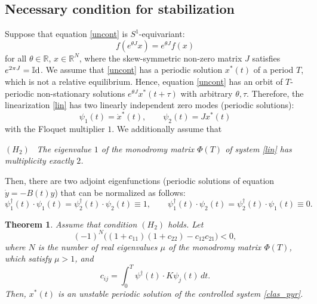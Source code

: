 \documentclass{article}
\newtheorem{theorem}{Theorem}[section]
\begin{document}
\subsection{Necessary condition for stabilization}
Suppose that equation \eqref{uncont} is $S^1$-equivariant:
\begin{equation}\label{21}
f(e^{\theta J}x)=e^{\theta J} f(x)
\end{equation}
for all $\theta \in\mathbb{R}$, $x\in\mathbb{R}^N$, where the skew-symmetric non-zero matrix $J$ satisfies $e^{2\pi J}=\mathbb{I}{\rm d}$.
We assume that \eqref{uncont} has a periodic solution $x^*(t)$ of a period $T$, which is not a relative equilibrium. Hence, equation \eqref{uncont} has
an orbit of $T$-periodic non-stationary solutions $e^{\theta J} x^*(t+\tau)$ with arbitrary $\theta,\tau$.
Therefore, the linearization \eqref{lin} has two linearly independent zero modes (periodic solutions):
\begin{equation}\label{22}
\psi_1(t)=\dot x^*(t),\qquad \psi_2(t)=J x^*(t)
\end{equation}
with the Floquet multiplier $1$.
We additionally assume that 

\bigskip
$(H_2)$ \ {\em The eigenvalue $1$ of the monodromy matrix $\Phi(T)$ of system \eqref{lin} has multiplicity exactly $2$.}

\bigskip
Then, there are two adjoint eigenfunctions (periodic solutions of equation $\dot y =-B(t)y$) that can be normalized as follows:
\begin{equation}\label{23}
\psi_1^\dagger(t)\cdot \psi_1(t)= \psi_2^\dagger(t)\cdot\psi_2(t)\equiv 1,\qquad
\psi_1^\dagger(t)\cdot \psi_2(t)= \psi_2^\dagger(t)\cdot\psi_1(t)\equiv 0.
\end{equation}

\begin{theorem}\label{t2}
Assume that condition $(H_2)$ holds. Let
\begin{equation}\label{s1maincond}
(-1)^N \bigl( (1+c_{11})(1+ c_{22})-c_{12}c_{21}\bigr)<0,
\end{equation}
where $N$ is the number of real eigenvalues $\mu$ of the monodromy matrix $\Phi(T)$, which satisfy $\mu>1$, and
\begin{equation}\label{cdef}
c_{ij}=\int_{0}^{T}  \psi^\dagger (t)\cdot K \psi_j(t)\,dt.
\end{equation}
Then, $x^*(t)$ is an {\em unstable} periodic solution of the controlled system \eqref{clas_pyr}.
\end{theorem}
\end{document}
